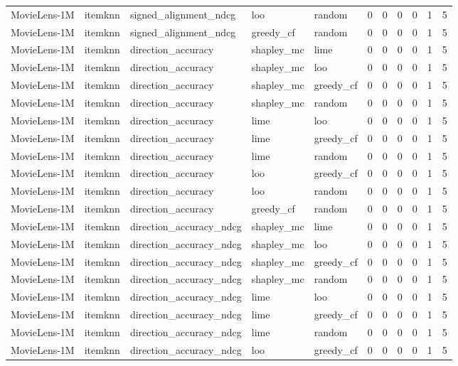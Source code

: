 \begin{table}[t]
{\begin{tabular}{lllllrrrrrr}
MovieLens-1M & itemknn & signed\_alignment\_ndcg & loo & random & 0 & 0 & 0 & 0 & 1 & 5 \\
MovieLens-1M & itemknn & signed\_alignment\_ndcg & greedy\_cf & random & 0 & 0 & 0 & 0 & 1 & 5 \\
MovieLens-1M & itemknn & direction\_accuracy & shapley\_mc & lime & 0 & 0 & 0 & 0 & 1 & 5 \\
MovieLens-1M & itemknn & direction\_accuracy & shapley\_mc & loo & 0 & 0 & 0 & 0 & 1 & 5 \\
MovieLens-1M & itemknn & direction\_accuracy & shapley\_mc & greedy\_cf & 0 & 0 & 0 & 0 & 1 & 5 \\
MovieLens-1M & itemknn & direction\_accuracy & shapley\_mc & random & 0 & 0 & 0 & 0 & 1 & 5 \\
MovieLens-1M & itemknn & direction\_accuracy & lime & loo & 0 & 0 & 0 & 0 & 1 & 5 \\
MovieLens-1M & itemknn & direction\_accuracy & lime & greedy\_cf & 0 & 0 & 0 & 0 & 1 & 5 \\
MovieLens-1M & itemknn & direction\_accuracy & lime & random & 0 & 0 & 0 & 0 & 1 & 5 \\
MovieLens-1M & itemknn & direction\_accuracy & loo & greedy\_cf & 0 & 0 & 0 & 0 & 1 & 5 \\
MovieLens-1M & itemknn & direction\_accuracy & loo & random & 0 & 0 & 0 & 0 & 1 & 5 \\
MovieLens-1M & itemknn & direction\_accuracy & greedy\_cf & random & 0 & 0 & 0 & 0 & 1 & 5 \\
MovieLens-1M & itemknn & direction\_accuracy\_ndcg & shapley\_mc & lime & 0 & 0 & 0 & 0 & 1 & 5 \\
MovieLens-1M & itemknn & direction\_accuracy\_ndcg & shapley\_mc & loo & 0 & 0 & 0 & 0 & 1 & 5 \\
MovieLens-1M & itemknn & direction\_accuracy\_ndcg & shapley\_mc & greedy\_cf & 0 & 0 & 0 & 0 & 1 & 5 \\
MovieLens-1M & itemknn & direction\_accuracy\_ndcg & shapley\_mc & random & 0 & 0 & 0 & 0 & 1 & 5 \\
MovieLens-1M & itemknn & direction\_accuracy\_ndcg & lime & loo & 0 & 0 & 0 & 0 & 1 & 5 \\
MovieLens-1M & itemknn & direction\_accuracy\_ndcg & lime & greedy\_cf & 0 & 0 & 0 & 0 & 1 & 5 \\
MovieLens-1M & itemknn & direction\_accuracy\_ndcg & lime & random & 0 & 0 & 0 & 0 & 1 & 5 \\
MovieLens-1M & itemknn & direction\_accuracy\_ndcg & loo & greedy\_cf & 0 & 0 & 0 & 0 & 1 & 5 \\

\end{tabular}}
\end{table}
